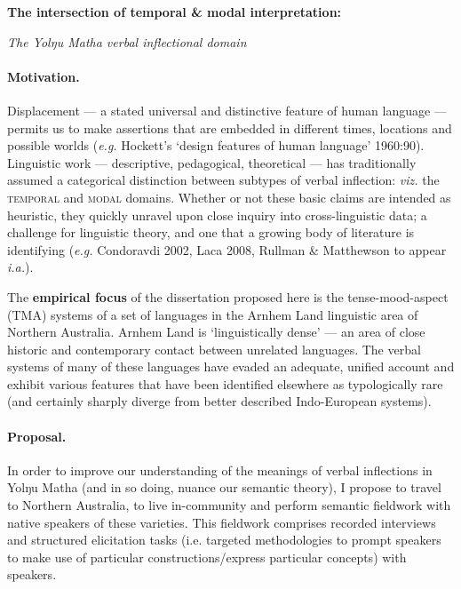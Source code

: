 \documentclass[11pt]{article}
\author{Josh}
\date{\today}
\begin{document}
	

\textbf{The intersection of temporal \& modal interpretation:}
			
\textit{			The Yolŋu Matha verbal inflectional domain}


		
		
	\paragraph{Motivation.} Displacement --- a stated universal and distinctive feature of human language ---  permits us to make assertions that are embedded in different times, locations and possible worlds (\textit{e.g.} Hockett's `design features of human language' 1960:90). Linguistic work --- descriptive, pedagogical, theoretical --- has traditionally assumed a categorical distinction between subtypes of verbal inflection: \textit{viz.} the \textsc{temporal} and \textsc{modal} domains. Whether or not these basic claims are intended as heuristic, they quickly unravel upon close inquiry into cross-linguistic data; a challenge for linguistic theory, and one that a growing body of literature is identifying (\textit{e.g. }Condoravdi 2002, Laca 2008, Rullman \& Matthewson to appear \textit{i.a.}).%
	
	The \textbf{empirical focus} of the dissertation proposed here is the tense-mood-aspect (TMA) systems of a set of languages in the Arnhem Land linguistic area of Northern Australia. Arnhem Land is `linguistically dense' --- an area of close historic and contemporary contact between unrelated languages. The verbal systems of many of these languages have evaded an adequate, unified account and exhibit various features that have been identified elsewhere as typologically rare (and certainly sharply diverge from better described Indo-European systems).
	
\paragraph{Proposal.} In order to improve our understanding of the meanings of verbal inflections in Yolŋu Matha (and in so doing, nuance our semantic theory), I propose to travel to Northern Australia, to live in-community and perform semantic fieldwork with native speakers of these varieties. This fieldwork comprises recorded interviews and structured elicitation tasks (i.e. targeted methodologies to prompt speakers to make use of particular constructions/express particular concepts) with speakers. 
\end{document}
